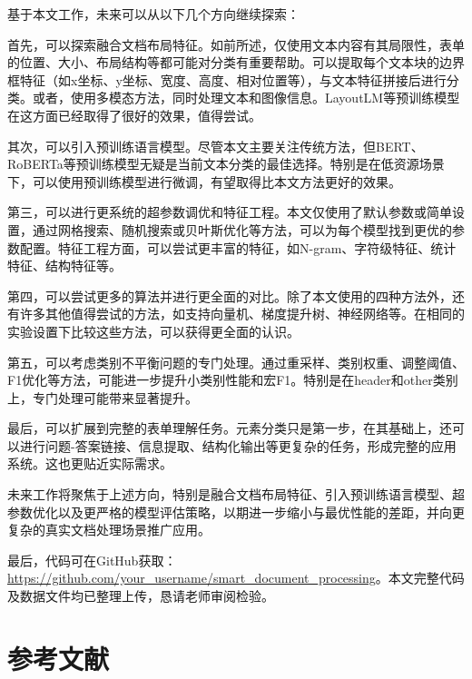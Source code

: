 \documentclass[12pt,a4paper]{article}
\begin{document}
基于本文工作，未来可以从以下几个方向继续探索：

首先，可以探索融合文档布局特征。如前所述，仅使用文本内容有其局限性，表单的位置、大小、布局结构等都可能对分类有重要帮助。可以提取每个文本块的边界框特征（如x坐标、y坐标、宽度、高度、相对位置等），与文本特征拼接后进行分类。或者，使用多模态方法，同时处理文本和图像信息。LayoutLM等预训练模型在这方面已经取得了很好的效果，值得尝试。

其次，可以引入预训练语言模型。尽管本文主要关注传统方法，但BERT、RoBERTa等预训练模型无疑是当前文本分类的最佳选择。特别是在低资源场景下，可以使用预训练模型进行微调，有望取得比本文方法更好的效果。

第三，可以进行更系统的超参数调优和特征工程。本文仅使用了默认参数或简单设置，通过网格搜索、随机搜索或贝叶斯优化等方法，可以为每个模型找到更优的参数配置。特征工程方面，可以尝试更丰富的特征，如N-gram、字符级特征、统计特征、结构特征等。

第四，可以尝试更多的算法并进行更全面的对比。除了本文使用的四种方法外，还有许多其他值得尝试的方法，如支持向量机、梯度提升树、神经网络等。在相同的实验设置下比较这些方法，可以获得更全面的认识。

第五，可以考虑类别不平衡问题的专门处理。通过重采样、类别权重、调整阈值、F1优化等方法，可能进一步提升小类别性能和宏F1。特别是在header和other类别上，专门处理可能带来显著提升。

最后，可以扩展到完整的表单理解任务。元素分类只是第一步，在其基础上，还可以进行问题-答案链接、信息提取、结构化输出等更复杂的任务，形成完整的应用系统。这也更贴近实际需求。

未来工作将聚焦于上述方向，特别是融合文档布局特征、引入预训练语言模型、超参数优化以及更严格的模型评估策略，以期进一步缩小与最优性能的差距，并向更复杂的真实文档处理场景推广应用。

最后，代码可在GitHub获取：\url{https://github.com/your_username/smart_document_processing}。本文完整代码及数据文件均已整理上传，恳请老师审阅检验。

\section*{参考文献}
\end{document}

